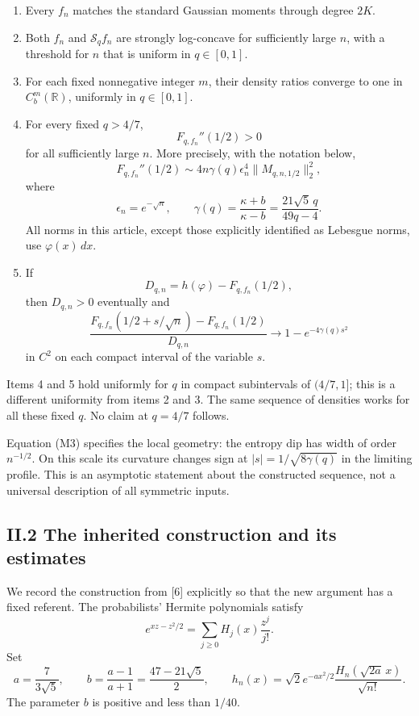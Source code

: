 \documentclass[
  british,
  10pt,
]{article}
\providecommand{\tightlist}{%
  \setlength{\itemsep}{0pt}\setlength{\parskip}{0pt}}
\begin{document}
\begin{enumerate}
\def\labelenumi{\arabic{enumi}.}
\tightlist
\item
  Every \(f_n\) matches the standard Gaussian moments through degree
  \(2K\).
\item
  Both \(f_n\) and \(\mathcal S_qf_n\) are strongly log-concave for
  sufficiently large \(n\), with a threshold for \(n\) that is uniform
  in \(q\in[0,1]\).
\item
  For each fixed nonnegative integer \(m\), their density ratios
  converge to one in \(C_b^m(\mathbb R)\), uniformly in \(q\in[0,1]\).
\item
  For every fixed \(q>4/7\), \[
  F_{q,f_n}''(1/2)>0
  \] for all sufficiently large \(n\). More precisely, with the notation
  below, \[
  F_{q,f_n}''(1/2)
  \sim4n\gamma(q)\epsilon_n^4\|M_{q,n,1/2}\|_2^2,
  \tag{M1}
  \] where \[
  \epsilon_n=e^{-\sqrt n},\qquad
  \gamma(q)=\frac{\kappa+b}{\kappa-b}
  =\frac{21\sqrt5\,q}{49q-4}.
  \tag{M2}
  \] All norms in this article, except those explicitly identified as
  Lebesgue norms, use \(\varphi(x)\,dx\).
\item
  If \[
  D_{q,n}=h(\varphi)-F_{q,f_n}(1/2),
  \] then \(D_{q,n}>0\) eventually and \[
  \frac{F_{q,f_n}(1/2+s/\sqrt n)-F_{q,f_n}(1/2)}
    {D_{q,n}}
  \longrightarrow 1-e^{-4\gamma(q)s^2}
  \tag{M3}
  \] in \(C^2\) on each compact interval of the variable \(s\).
\end{enumerate}

Items 4 and 5 hold uniformly for \(q\) in compact subintervals of
\((4/7,1]\); this is a different uniformity from items 2 and 3. The same
sequence of densities works for all these fixed \(q\). No claim at
\(q=4/7\) follows.

Equation (M3) specifies the local geometry: the entropy dip has width of
order \(n^{-1/2}\). On this scale its curvature changes sign at
\(|s|=1/\sqrt{8\gamma(q)}\) in the limiting profile. This is an
asymptotic statement about the constructed sequence, not a universal
description of all symmetric inputs.

\subsection{II.2 The inherited construction and its
estimates}\label{ii.2-the-inherited-construction-and-its-estimates}

We record the construction from {[}6{]} explicitly so that the new
argument has a fixed referent. The probabilists' Hermite polynomials
satisfy \[
e^{xz-z^2/2}=\sum_{j\ge0}H_j(x)\frac{z^j}{j!}.
\] Set \[
a=\frac7{3\sqrt5},\qquad
b=\frac{a-1}{a+1}=\frac{47-21\sqrt5}{2},\qquad
h_n(x)=\sqrt2e^{-ax^2/2}
          \frac{H_n(\sqrt{2a}\,x)}{\sqrt{n!}}.
\tag{M4}
\] The parameter \(b\) is positive and less than \(1/40\).
\end{document}
